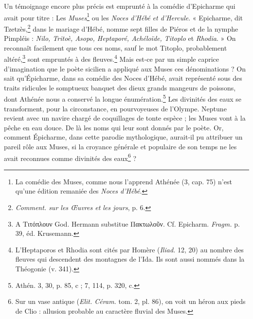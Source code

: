 \documentclass[landscape, a4paper, 11pt, oneside, polutonikogreek, french]{article}
\begin{document}
Un témoignage encore plus précis est emprunté à la comédie d'Epicharme qui avait pour titre : Les \emph{Muses}\footnote{La comédie des Muses, comme nous l'apprend Athénée (3, cap. 75) n'est qu'une édition remaniée des \emph{Noces d'Hébé}.} ou les \emph{Noces d'Hébé et d'Hercule}. « Epicharme, dit Tzetzès,\footnote{\emph{Comment. sur les Œuvres et les jours}, p. 6.} dans le mariage d'Hébé, nomme sept filles de Piéros et de la nymphe Pimpléis : \emph{Nilo, Tritoè, Asopo, Heptaporé, Achéloïde, Titoplo} et \emph{Rhodia}. » On reconnaît facilement que tous ces noms, sauf le mot Titoplo, probablement altéré,\footnote{A Τιτόπλουν God. Hermann substitue Πακτωλοῦν. Cf. Epicharm. \emph{Fragm.} p. 39, éd. Krusemann.} sont empruntés à des fleuves.\footnote{L'Heptaporos et Rhodia sont cités par Homère (\emph{Iliad.} 12, 20) au nombre des fleuves qui descendent des montagnes de l'Ida. Ils sont aussi nommés dans la Théogonie (v. 341).} Mais est-ce par un simple caprice d'imagination que le poète sicilien a appliqué aux Muses ces dénominations ? On sait qu'Épicharme, dans sa comédie des Noces d'Hébé, avait représenté sous des traits ridicules le somptueux banquet des dieux grands mangeurs de poissons, dont Athénée nous a conservé la longue énumération.\footnote{Athén. 3, 30, p. 85, c ; 7, 114, p. 320, c.} Les divinités des eaux se transforment, pour la circonstance, en pourvoyeuses de l'Olympe. Neptune revient avec un navire chargé de coquillages de tonte espèce ; les Muses vont à la pêche en eau douce. De là les noms qui leur sont donnés par le poète. Or, comment Épicharme, dans cette parodie mythologique, aurait-il pu attribuer un pareil rôle aux Muses, si la croyance générale et populaire de son temps ne les avait reconnues comme divinités des eaux\footnote{Sur un vase antique (\emph{Elit. Céram.} tom. 2, pl. 86), on voit un héron aux pieds de Clio : allusion probable au caractère fluvial des Muses.} ?
\end{document}
